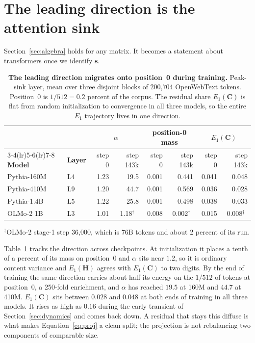 \documentclass{article}
\theoremstyle{spaced}
\theoremstyle{definition}
\newcommand{\bH}{\mathbf{H}}
\newcommand{\bC}{\mathbf{C}}
\newcommand{\bs}{\mathbf{s}}
\begin{document}
\FloatBarrier   %
\section{The leading direction is the attention sink}
\label{sec:sink}

Section~\ref{sec:algebra} holds for any matrix. It becomes a statement about transformers once we identify $\bs$.

\begin{table}[t]
\centering
\caption{\textbf{The leading direction migrates onto position~0 during training.} Peak-sink layer, mean over three disjoint blocks of 200{,}704 OpenWebText tokens. Position~0 is $1/512 = 0.2$ percent of the corpus. The residual share $E_1(\bC)$ is flat from random initialization to convergence in all three models, so the entire $E_1$ trajectory lives in one direction.}
\label{tab:sink}
\small
\begin{tabular}{@{}llrrrrrr@{}}
\toprule
& & \multicolumn{2}{c}{$\alpha$} & \multicolumn{2}{c}{position-0 mass} & \multicolumn{2}{c}{$E_1(\bC)$} \\
\cmidrule(lr){3-4}\cmidrule(lr){5-6}\cmidrule(lr){7-8}
\textbf{Model} & \textbf{Layer} & step 0 & step 143k & step 0 & step 143k & step 0 & step 143k \\
\midrule
Pythia-160M & L4 & 1.23 & 19.5 & 0.001 & 0.441 & 0.041 & 0.048 \\
Pythia-410M & L9 & 1.20 & 44.7 & 0.001 & 0.569 & 0.036 & 0.028 \\
Pythia-1.4B & L5 & 1.22 & 25.8 & 0.001 & 0.498 & 0.038 & 0.033 \\
\midrule
OLMo-2 1B & L3 & 1.01 & \multicolumn{1}{c}{1.18$^\dagger$} & 0.008 & \multicolumn{1}{c}{0.002$^\dagger$} & 0.015 & \multicolumn{1}{c}{0.008$^\dagger$} \\
\bottomrule
\end{tabular}
\vspace{2pt}

\raggedright\footnotesize $^\dagger$OLMo-2 stage-1 step 36{,}000, which is 76B tokens and about 2 percent of its run.
\end{table}

Table~\ref{tab:sink} tracks the direction across checkpoints. At initialization it places a tenth of a percent of its mass on position~0 and $\alpha$ sits near $1.2$, so it is ordinary content variance and $E_1(\bH)$ agrees with $E_1(\bC)$ to two digits. By the end of training the same direction carries about half its energy on the $1/512$ of tokens at position~0, a 250-fold enrichment, and $\alpha$ has reached $19.5$ at 160M and $44.7$ at 410M. $E_1(\bC)$ sits between $0.028$ and $0.048$ at both ends of training in all three models. It rises as high as $0.16$ during the early transient of Section~\ref{sec:dynamics} and comes back down. A residual that stays this diffuse is what makes Equation~\ref{eq:proj} a clean split; the projection is not rebalancing two components of comparable size.
\end{document}
